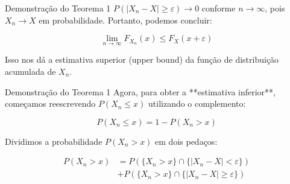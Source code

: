 \documentclass[12pt]{beamer}
\begin{document}
\begin{frame}{}
	\begin{block}{Demonstração do Teorema 1}
	\( P(|X_n - X| \geq \varepsilon) \to 0 \) conforme \( n \to \infty \), pois \( X_n \to X \) em probabilidade. Portanto, podemos concluir:
		
		\[
		\lim_{n \to \infty} F_{X_n}(x) \leq F_X(x + \varepsilon)
		\]
		
		Isso nos dá a estimativa superior (upper bound) da função de distribuição acumulada de \( X_n \).
	\end{block}
\end{frame}


\begin{frame}{}
	\begin{block}{Demonstração do Teorema 1}
	Agora, para obter a **estimativa inferior**, começamos reescrevendo \( P(X_n \leq x) \) utilizando o complemento:
	
	\[
	P(X_n \leq x) = 1 - P(X_n > x)
	\]
	
	Dividimos a probabilidade \( P(X_n > x) \) em dois pedaços:
	
\begin{align*}
	P(X_n > x) &= P(\{X_n > x\} \cap \{|X_n - X| < \varepsilon\})\\
	& + P(\{X_n > x\} \cap \{|X_n - X| \geq \varepsilon\})
\end{align*}
	\end{block}
\end{frame}


\end{document}
